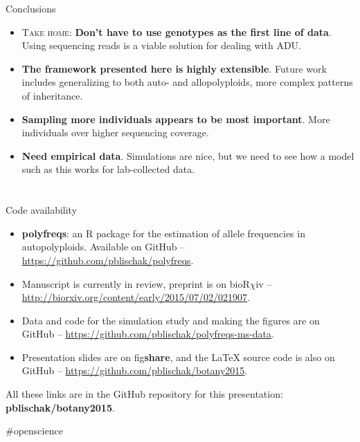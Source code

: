 \documentclass[presentation,sansserif]{beamer}
\begin{document}
\begin{frame}[t]{Conclusions}
	\fontsize{10pt}{10}\selectfont
	\begin{itemize}
		\item \textsc{Take home}: \textbf{Don't have to use genotypes as the first line of data}. Using sequencing reads is a viable solution for dealing with ADU.
		\vspace{0.2in}

		\item \textbf{The framework presented here is highly extensible}. Future work includes generalizing to both auto- and allopolyploids, more complex patterns of inheritance.
		\vspace{0.2in}

		\item \textbf{Sampling more individuals appears to be most important}. More individuals over higher sequencing coverage.
		\vspace{0.2in}

		\item \textbf{Need empirical data}. Simulations are nice, but we need to see how a model such as this works for lab-collected data.

	\end{itemize}

\end{frame}

\section*{}

\begin{frame}[t,plain]{Code availability}
	\fontsize{10pt}{10}\selectfont
	\begin{itemize}
		\item \textbf{polyfreqs}: an R package for the estimation of allele frequencies in autopolyploids. Available on GitHub -- \url{https://github.com/pblischak/polyfreqs}.
		\vspace{0.2in}

		\item Manuscript is currently in review, preprint is on bioR$\chi$iv -- \url{http://biorxiv.org/content/early/2015/07/02/021907}.
		\vspace{0.2in}

		\item Data and code for the simulation study and making the figures are on GitHub -- \url{https://github.com/pblischak/polyfreqs-ms-data}.
		\vspace{0.2in}

		\item Presentation slides are on fig\textbf{share}, and the \LaTeX{} source code is also on GitHub -- \url{https://github.com/pblischak/botany2015}.
	\end{itemize}
	\vspace{0.15in}

	{\Large \alert{All these links are in the GitHub repository for this presentation: \textbf{pblischak/botany2015}.}}

	\hfill {\tiny \#openscience}
\end{frame}
\end{document}

